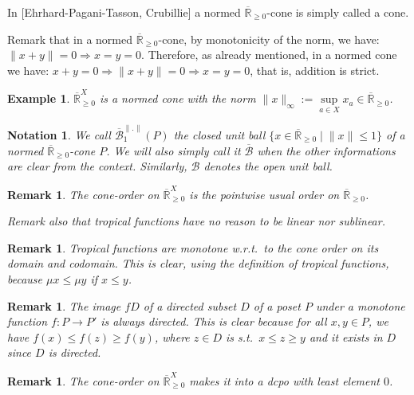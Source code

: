 \documentclass[submission,copyright,creativecommons]{eptcs}
\newtheorem{Example}[theorem]{Example}
\newtheorem{Remark}[theorem]{Remark}
\newtheorem{Notation}[theorem]{Notation}
\newcommand{\R}{\mathbb{R}}
\newcommand{\set}[1]{\{#1\}}
\newcommand{\norm}[1]{\lVert #1 \lVert}
\newcommand{\supnorm}[1]{\lVert #1 \lVert_\infty}
\begin{document}
In [Ehrhard-Pagani-Tasson, Crubillie] a normed $\overline{\R}_{\geq 0}$-cone is simply called a cone.

Remark that in a normed $\overline{\R}_{\geq 0}$-cone, by monotonicity of the norm, we have: $\norm{x+y}=0 \Rightarrow x=y=0$.
Therefore, as already mentioned, in a normed cone we have: 
$x+y=0 \Rightarrow \norm{x+y}=0 \Rightarrow x=y=0$, that is, addition is strict.

\begin{Example}
 $\overline{\R}_{\geq 0}^X$ is a normed cone with the norm $\supnorm{x}:=\sup\limits_{a\in X} x_a\in \overline{\R}_{\geq 0}$.
\end{Example}

\begin{Notation}
 We call $\overline{\mathscr{B}}^{\norm{.}}_1(P)$ the closed unit ball $\set{x\in\overline{\R}_{\geq 0}\mid \norm{x}\leq 1}$ of a normed $\overline{\R}_{\geq 0}$-cone $P$.
 We will also simply call it $\overline{\mathscr B}$ when the other informations are clear from the context.
 Similarly, $\mathscr B$ denotes the open unit ball.
\end{Notation}

\begin{Remark}
 The cone-order on $\overline{\R}_{\geq 0}^X$ is the pointwise usual order on $\overline{\R}_{\geq 0}$.
 
 Remark also that tropical functions have no reason to be linear nor sublinear.
\end{Remark}

\begin{Remark}\label{rmk:tropMonot}
 Tropical functions are monotone w.r.t.\ to the cone order on its domain and codomain.
 This is clear, using the definition of tropical functions, because $\mu x\leq \mu y$ if $x\leq y$.
\end{Remark}

\begin{Remark}
 The image $fD$ of a directed subset $D$ of a poset $P$ under a monotone function $f:P\to P'$ is always directed.
 This is clear because for all $x,y\in P$, we have $f(x)\leq f(z)\geq f(y)$, where $z\in D$ is s.t.\ $x\leq z\geq y$ and it exists in $D$ since $D$ is directed.
 \end{Remark}

\begin{Remark}
 The cone-order on $\overline{\R}_{\geq 0}^X$ makes it into a dcpo with least element $0$.
\end{Remark}
\end{document}
